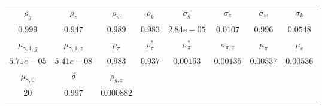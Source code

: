 \begin{tabular}{cccccccc} \\ \hline$\rho_g$&$\rho_z$&$\rho_w$&$\rho_k$&$\sigma_g$&$\sigma_z$&$\sigma_w$&$\sigma_k$\\$0.999$&$0.947$&$0.989$&$0.983$&$2.84e-05$&$0.0107$&$0.996$&$0.0548$\\ \hline$\mu_{\gamma,1,g}$&$\mu_{\gamma,1,z}$&$\rho_\pi$&$\rho_{\pi}^*$&$\sigma_{\pi}^*$&$\sigma_{\pi,z}$&$\mu_\pi$&$\mu_c$\\$5.71e-05$&$5.41e-08$&$0.983$&$0.937$&$0.00163$&$0.00135$&$0.00537$&$0.00536$\\ \hline$\mu_{\gamma,0}$&$\delta$&$\rho_{g,z}$\\$20$&$0.997$&$0.000882$\\ \hline \end{tabular}